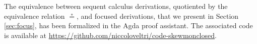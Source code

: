 \documentclass[copyright,creativecommons]{eptcs}
\theoremstyle{definition}
\begin{document}

The equivalence between sequent calculus derivations, quotiented by the equivalence relation $\circeq$, and focused derivations, that we present in Section \ref{sec:focus}, has been formalized in the Agda proof assistant. The associated code is available at \url{https://github.com/niccoloveltri/code-skewmonclosed}.
\end{document}
